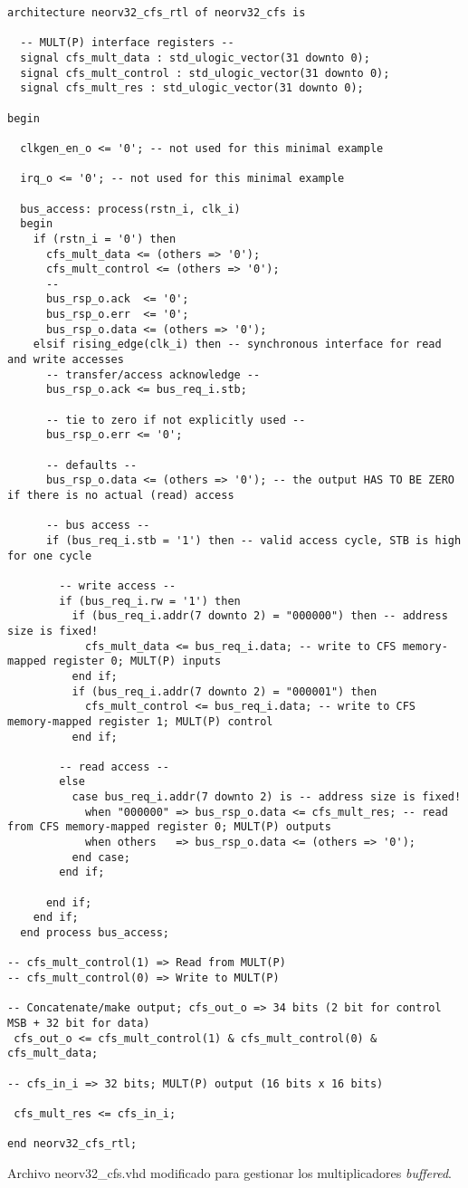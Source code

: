 \begin{code}
\begin{verbatim}
architecture neorv32_cfs_rtl of neorv32_cfs is

  -- MULT(P) interface registers --
  signal cfs_mult_data : std_ulogic_vector(31 downto 0);
  signal cfs_mult_control : std_ulogic_vector(31 downto 0);
  signal cfs_mult_res : std_ulogic_vector(31 downto 0);

begin

  clkgen_en_o <= '0'; -- not used for this minimal example

  irq_o <= '0'; -- not used for this minimal example

  bus_access: process(rstn_i, clk_i)
  begin
    if (rstn_i = '0') then
      cfs_mult_data <= (others => '0');
      cfs_mult_control <= (others => '0');
      --
      bus_rsp_o.ack  <= '0';
      bus_rsp_o.err  <= '0';
      bus_rsp_o.data <= (others => '0');
    elsif rising_edge(clk_i) then -- synchronous interface for read and write accesses
      -- transfer/access acknowledge --
      bus_rsp_o.ack <= bus_req_i.stb;

      -- tie to zero if not explicitly used --
      bus_rsp_o.err <= '0';

      -- defaults --
      bus_rsp_o.data <= (others => '0'); -- the output HAS TO BE ZERO if there is no actual (read) access

      -- bus access --
      if (bus_req_i.stb = '1') then -- valid access cycle, STB is high for one cycle

        -- write access --
        if (bus_req_i.rw = '1') then
          if (bus_req_i.addr(7 downto 2) = "000000") then -- address size is fixed!
            cfs_mult_data <= bus_req_i.data; -- write to CFS memory-mapped register 0; MULT(P) inputs
          end if;
          if (bus_req_i.addr(7 downto 2) = "000001") then
            cfs_mult_control <= bus_req_i.data; -- write to CFS memory-mapped register 1; MULT(P) control
          end if;

        -- read access --
        else
          case bus_req_i.addr(7 downto 2) is -- address size is fixed!
            when "000000" => bus_rsp_o.data <= cfs_mult_res; -- read from CFS memory-mapped register 0; MULT(P) outputs
            when others   => bus_rsp_o.data <= (others => '0');
          end case;
        end if;

      end if;
    end if;
  end process bus_access;

-- cfs_mult_control(1) => Read from MULT(P)
-- cfs_mult_control(0) => Write to MULT(P)

-- Concatenate/make output; cfs_out_o => 34 bits (2 bit for control MSB + 32 bit for data)
 cfs_out_o <= cfs_mult_control(1) & cfs_mult_control(0) & cfs_mult_data; 

-- cfs_in_i => 32 bits; MULT(P) output (16 bits x 16 bits)

 cfs_mult_res <= cfs_in_i;

end neorv32_cfs_rtl;
\end{verbatim}
\caption{Archivo neorv32\_cfs.vhd modificado para gestionar los multiplicadores \textit{buffered}.}
\label{ap-cod:17}
\end{code}

